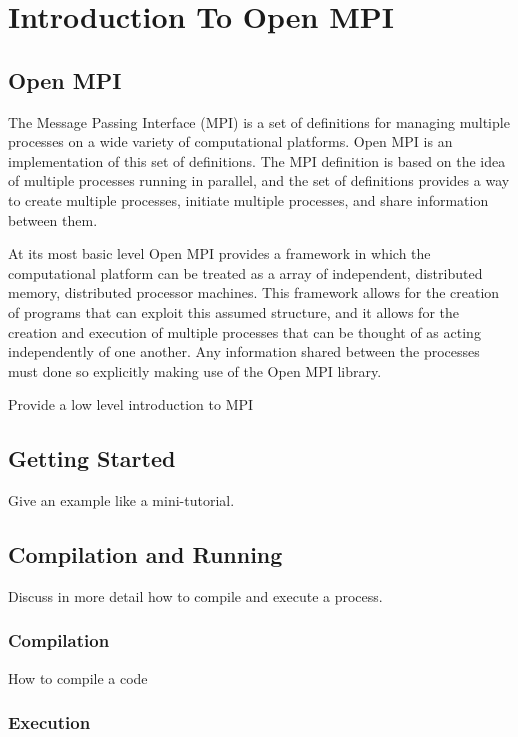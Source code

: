 
\chapter{Introduction To Open MPI}

\section{Open MPI}

The Message Passing Interface (MPI) is a set of definitions for
managing multiple processes on a wide variety of computational
platforms. Open MPI is an implementation of this set of definitions.
The MPI definition is based on the idea of multiple processes running
in parallel, and the set of definitions provides a way to create
multiple processes, initiate multiple processes, and share information
between them.

At its most basic level Open MPI provides a framework in which the
computational platform can be treated as a array of independent,
distributed memory, distributed processor machines. This framework
allows for the creation of programs that can exploit this assumed
structure, and it allows for the creation and execution of multiple
processes that can be thought of as acting independently of one
another.  Any information shared between the processes must done so
explicitly making use of the Open MPI library.

\todo Provide a low level introduction to MPI

\section{Getting Started}

\todo Give an example like a mini-tutorial.

\section{Compilation and Running}

\todo Discuss in more detail how to compile and execute a process. 

\subsection{Compilation}

\todo How to compile a code

\subsection{Execution}

